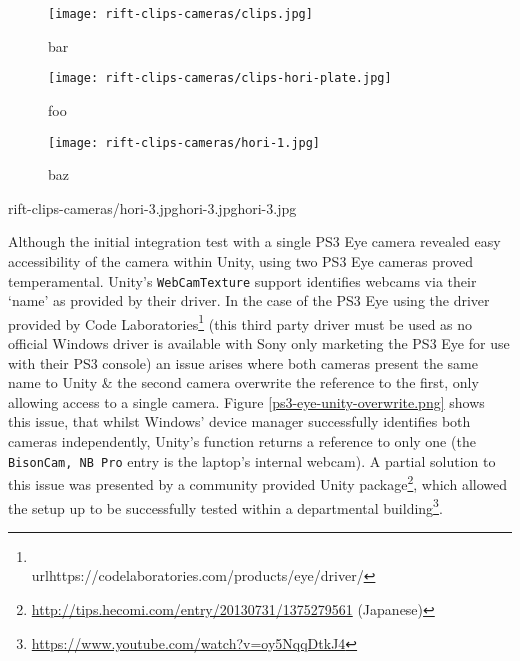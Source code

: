 \begin{figure}[!htb]
    \centering
    \begin{minipage}{.32\textwidth}
        \centering
        \texttt{[image: rift-clips-cameras/clips.jpg]}
        \caption{bar}
        \label{clips.jpg}
    \end{minipage}%
    \hspace{.01\textwidth}
    \begin{minipage}{0.32\textwidth}
        \centering
        \texttt{[image: rift-clips-cameras/clips-hori-plate.jpg]}
        \caption{foo}
        \label{clips-hori-plate.jpg}
    \end{minipage}%
    \hspace{.01\textwidth}
    \begin{minipage}{0.32\textwidth}
        \centering
        \texttt{[image: rift-clips-cameras/hori-1.jpg]}
        \caption{baz}
        \label{hori-1.jpg}
    \end{minipage}
\end{figure}

       {rift-clips-cameras/hori-3.jpg}{hori-3.jpg}{hori-3.jpg}

Although the initial integration test with a single PS3 Eye camera revealed easy accessibility of the camera within Unity, using two PS3 Eye cameras proved temperamental. Unity's \texttt{WebCamTexture} support identifies webcams via their `name' as provided by their driver. In the case of the PS3 Eye using the driver provided by Code Laboratories\footnote{\\url{https://codelaboratories.com/products/eye/driver/}} (this third party driver must be used as no official Windows driver is available with Sony only marketing the PS3 Eye for use with their PS3 console) an issue arises where both cameras present the same name to Unity \& the second camera overwrite the reference to the first, only allowing access to a single camera. Figure \ref{ps3-eye-unity-overwrite.png} shows this issue, that whilst Windows' device manager successfully identifies both cameras independently, Unity's  function returns a reference to only one (the \texttt{BisonCam, NB Pro} entry is the laptop's internal webcam). A partial solution to this issue was presented by a community provided Unity package\footnote{\url{http://tips.hecomi.com/entry/20130731/1375279561} (Japanese)}, which allowed the setup up to be successfully tested within a departmental building\footnote{\url{https://www.youtube.com/watch?v=oy5NqqDtkJ4}}.


